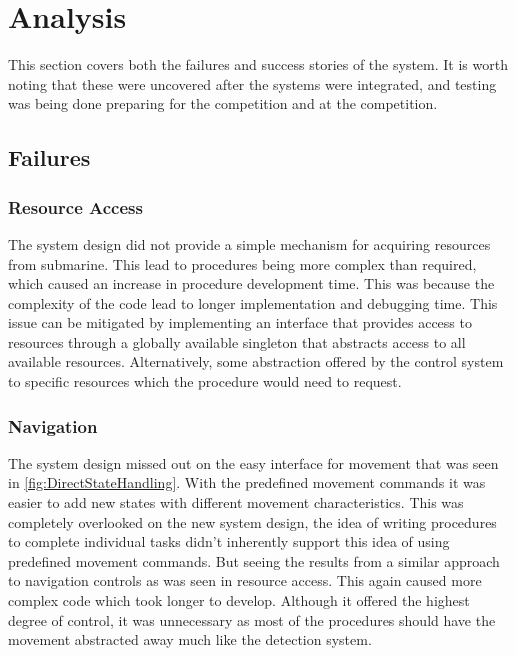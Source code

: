 
\chapter{Analysis} %

\label{Chapter4} %

This section covers both the failures and success stories of the system. It is worth noting that these were uncovered after the systems were integrated, and testing was being done preparing for the competition and at the competition.


\section{Failures}

\subsection{Resource Access}
The system design did not provide a simple mechanism for acquiring resources from submarine. This lead to procedures being more complex than required, which caused an increase in procedure development time. This was because the complexity of the code lead to longer implementation and debugging time. This issue can be mitigated by implementing an interface that provides access to resources through a globally available singleton that abstracts access to all available resources. Alternatively, some abstraction offered by the control system to specific resources which the procedure would need to request.

\subsection{Navigation}
The system design missed out on the easy interface for movement that was seen in \ref{fig:DirectStateHandling}. With the predefined movement commands it was easier to add new states with different movement characteristics. This was completely overlooked on the new system design, the idea of writing procedures to complete individual tasks didn't inherently support this idea of using predefined movement commands. But seeing the results from a similar approach to navigation controls as was seen in resource access. This again caused more complex code which took longer to develop. Although it offered the highest degree of control, it was unnecessary as most of the procedures should have the movement abstracted away much like the detection system.

